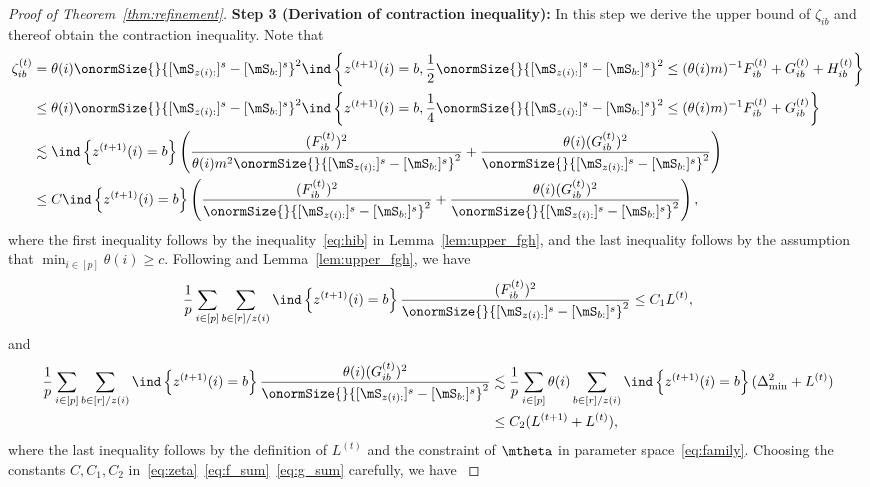 \documentclass[lettersize,onecolumn,journal]{IEEEtran}
\theoremstyle{definition}
\theoremstyle{definition}
\newcommand{\of}[1]{\left(#1\right)}
\newcommand{\offf}[1]{\left\{#1\right\}}
\begin{document}
\begin{proof}[Proof of Theorem~\ref{thm:refinement}]
{    {\bf Step 3 (Derivation of contraction inequality):} In this step we derive the upper bound of $\zeta_{ib}$ and thereof obtain the contraction inequality. Note that 
    \begin{align}
        \zeta_{ib}^{(t)} &= \theta(i) \onormSize{}{ [ \mS_{ z(i):}  ]^s - [ \mS_{b:}  ]^s  }^2 \ind \offf{z^{(t+1)}(i) = b, \frac{1}{2}\onormSize{}{ [ \mS_{z(i):}  ]^s - [ \mS_{b:}  ]^s  }^2 \leq (\theta(i) m)^{-1} F_{ib}^{(t)} + G_{ib}^{(t)} + H_{ib}^{(t)} }\\
        & \leq \theta(i) \onormSize{}{ [ \mS_{ z(i):}  ]^s - [ \mS_{b:}  ]^s  }^2 \ind \offf{z^{(t+1)}(i) = b, \frac{1}{4}\onormSize{}{ [ \mS_{z(i):}  ]^s - [ \mS_{b:}  ]^s  }^2 \leq (\theta(i) m)^{-1} F_{ib}^{(t)} + G_{ib}^{(t)} } \\
        & \lesssim \ind \offf{ z^{(t+1)}(i) = b} \of{  \frac{(F_{ib}^{(t)})^2}{ \theta(i)m^2\onormSize{}{ [ \mS_{z(i):}  ]^s - [ \mS_{b:}  ]^s  }^2} + \frac{\theta(i)(G_{ib}^{(t)})^2}{ \onormSize{}{ [ \mS_{z(i):}  ]^s - [ \mS_{b:}  ]^s  }^2}    }\\
        &\leq C \ind \offf{ z^{(t+1)}(i) = b} \of{  \frac{(F_{ib}^{(t)})^2}{ \onormSize{}{ [ \mS_{z(i):}  ]^s - [ \mS_{b:}  ]^s  }^2} + \frac{\theta(i)(G_{ib}^{(t)})^2}{ \onormSize{}{ [ \mS_{z(i):}  ]^s - [ \mS_{b:}  ]^s  }^2}    },\label{eq:zeta}
    \end{align}
    where the first inequality follows by the inequality~\eqref{eq:hib} in Lemma~\ref{lem:upper_fgh}, and the last inequality follows by the assumption that $\min_{i \in [p]} \theta(i) \geq c$. Following \citet[Step 4, Proof of Theorem 2]{han2020exact} and Lemma~\ref{lem:upper_fgh}, we have 
    \begin{align}\label{eq:f_sum}
          \frac{1}{p} \sum_{i \in [p]}\sum_{b \in [r]/z(i)} \ind \offf{ z^{(t+1)}(i) = b} \frac{(F_{ib}^{(t)})^2}{ \onormSize{}{ [ \mS_{z(i):}  ]^s - [ \mS_{b:}  ]^s  }^2} \leq C_1 L^{(t)},
    \end{align}
    and 
    \begin{align}
         \frac{1}{p} \sum_{i \in [p]}\sum_{b \in [r]/z(i)} \ind \offf{ z^{(t+1)}(i) = b} \frac{\theta(i)(G_{ib}^{(t)})^2}{ \onormSize{}{ [ \mS_{z(i):}  ]^s - [ \mS_{b:}  ]^s  }^2}  &\lesssim \frac{1}{p} \sum_{i \in [p]}\theta(i) \sum_{b \in [r]/z(i)}   \ind \offf{ z^{(t+1)}(i) = b}  (\Delta_{\min}^2 + L^{(t)}) \\
         & \leq C_2 (L^{(t+1)} + L^{(t)}), \label{eq:g_sum}
    \end{align}
    where the last inequality follows by the definition of $L^{(t)}$ and the constraint of $\mtheta$ in parameter space~\eqref{eq:family}. Choosing the constants $C, C_1, C_2$ in~\eqref{eq:zeta}~\eqref{eq:f_sum}~\eqref{eq:g_sum} carefully, we have 
}
\end{proof}
\end{document}
